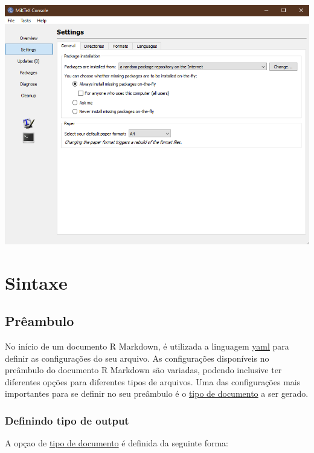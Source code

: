 \documentclass[
]{book}
\begin{document}
\begin{center}\includegraphics[width=1\linewidth]{img/03} \end{center}

\hypertarget{sintaxe}{%
\chapter{Sintaxe}\label{sintaxe}}

\hypertarget{pruxeaambulo}{%
\section{Prêambulo}\label{pruxeaambulo}}

No início de um documento R Markdown, é utilizada a linguagem \href{https://pt.wikipedia.org/wiki/YAML}{yaml} para definir as configurações do seu arquivo.
As configurações disponíveis no preâmbulo do documento R Markdown são variadas, podendo inclusive ter diferentes opções para diferentes tipos de arquivos.
Uma das configurações mais importantes para se definir no seu preâmbulo é o \protect\hyperlink{possuxedveis-tipos-de-outputs}{tipo de documento} a ser gerado.

\hypertarget{definindo-tipo-de-output}{%
\subsection{Definindo tipo de output}\label{definindo-tipo-de-output}}

A opçao de \protect\hyperlink{possuxedveis-tipos-de-outputs}{tipo de documento} é definida da seguinte forma:
\end{document}
